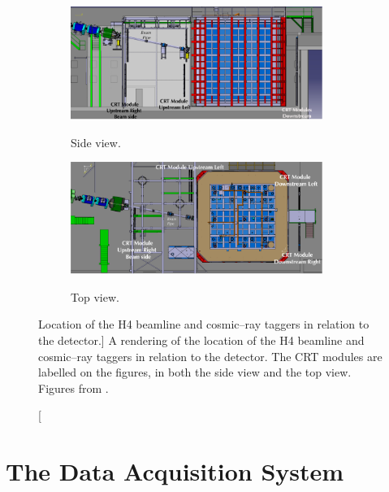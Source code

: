 \begin{figure}

	\centering

	\begin{subfigure}[b]{\textwidth}
		\centering
		\includegraphics[width=0.9\textwidth]{figures/crt_side.pdf}
		\label{fig:crt_side}
		\caption{Side view.}
	\end{subfigure}

	\vspace{3mm}

	\begin{subfigure}[b]{\textwidth}
		\centering
		\includegraphics[width=0.9\textwidth]{figures/crt_top.pdf}
		\label{fig:crt_top}
		\caption{Top view.}
	\end{subfigure}

	\caption
	[Location of the H4 beamline and cosmic--ray taggers in relation to the
	\protodune{} detector.]
	{A rendering of the location of the H4 beamline and cosmic--ray taggers in 
	relation to the \protodune{} detector. The CRT modules are labelled on the
	figures, in both the side view and the top view. Figures from 
	\cite{protoduneperf}.}

	\label{fig:pdsp_CRT}

\end{figure}

\section{The Data Acquisition System}

